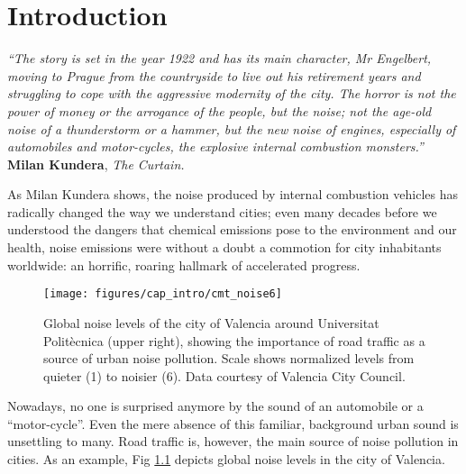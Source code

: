 \chapter{Introduction} \label{cap:intro}

\null\vspace{-10mm}
\begin{flushright}
\begin{minipage}[t]{0.66\textwidth}
{\itshape\small``The story is set in the year 1922 and has its main character, Mr Engelbert, moving to Prague from the countryside to live out his retirement years and struggling to cope with the aggressive modernity of the city. The horror is not the power of money or the arrogance of the people, but the noise; not the age-old noise of a thunderstorm or a hammer, but the new noise of engines, especially of automobiles and motor-cycles, the explosive internal combustion monsters.''}\\[-3mm]

{\cabincondensed\small\hfill \textbf{Milan Kundera}, \emph{The Curtain.}}\\[5mm]
\end{minipage}
\end{flushright}

\noindent As Milan Kundera shows, the noise produced by internal combustion vehicles has radically changed the way we understand cities; even many decades before we understood the dangers that chemical emissions pose to the environment and our health, noise emissions were without a doubt a commotion for city inhabitants worldwide: an horrific, roaring hallmark of accelerated progress.

\begin{figure}[t!]
\centering
\texttt{[image: figures/cap\_intro/cmt\_noise6]}
\caption{Global noise levels of the city of Valencia around Universitat Politècnica (upper right), showing the importance of road traffic as a source of urban noise pollution. Scale shows normalized levels from quieter (1) to noisier (6). Data courtesy of Valencia City Council.}
\label{fig:noise_valencia}
\end{figure}

Nowadays, no one is surprised anymore by the sound of an automobile or a ``motor-cycle''. Even the mere absence of this familiar, background urban sound is unsettling to many. Road traffic is, however, the main source of noise pollution in cities. As an example, Fig \ref{fig:noise_valencia} depicts global noise levels in the city of Valencia.

